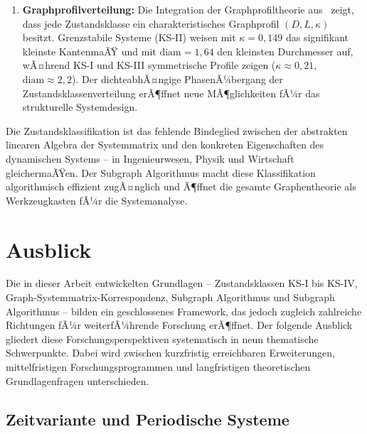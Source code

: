 ﻿\documentclass[12pt, a4paper, titlepage]{report}
\theoremstyle{definition}
\theoremstyle{remark}
\begin{document}
\begin{enumerate}[label=(\roman*)]
  \item \textbf{Graphprofilverteilung:} Die Integration der Graphprofiltheorie
    aus~\citep{epp2026graphs} zeigt, dass jede Zustandsklasse ein charakteristisches
    Graphprofil $(D, L, \kappa)$ besitzt. Grenzstabile Systeme (KS-II) weisen
    mit $\kappa = 0{,}149$ das signifikant kleinste KantenmaÃŸ und mit
    $\mathrm{diam} = 1{,}64$ den kleinsten Durchmesser auf, wÃ¤hrend KS-I und KS-III
    symmetrische Profile zeigen ($\kappa \approx 0{,}21$, $\mathrm{diam} \approx 2{,}2$).
    Der dichteabhÃ¤ngige PhasenÃ¼bergang der Zustandsklassenverteilung erÃ¶ffnet neue
    MÃ¶glichkeiten fÃ¼r das strukturelle Systemdesign.
\end{enumerate}

Die Zustandsklassifikation ist das fehlende Bindeglied zwischen der abstrakten linearen
Algebra der Systemmatrix und den konkreten Eigenschaften des dynamischen Systems --
in Ingenieurwesen, Physik und Wirtschaft gleichermaÃŸen. Der Subgraph Algorithmus
macht diese Klassifikation algorithmisch effizient zugÃ¤nglich und Ã¶ffnet die gesamte
Graphentheorie als Werkzeugkasten fÃ¼r die Systemanalyse.

\chapter{Ausblick}
\label{sec:ausblick}

Die in dieser Arbeit entwickelten Grundlagen -- Zustandsklassen KS-I bis KS-IV,
Graph-Systemmatrix-Korrespondenz, Subgraph Algorithmus und Subgraph Algorithmus --
bilden ein geschlossenes Framework, das jedoch zugleich zahlreiche Richtungen fÃ¼r
weiterfÃ¼hrende Forschung erÃ¶ffnet. Der folgende Ausblick gliedert diese
Forschungsperspektiven systematisch in neun thematische Schwerpunkte. Dabei wird
zwischen kurzfristig erreichbaren Erweiterungen, mittelfristigen Forschungsprogrammen
und langfristigen theoretischen Grundlagenfragen unterschieden.

\section{Zeitvariante und Periodische Systeme}
\label{subsec:zeitvariant}
\end{document}
